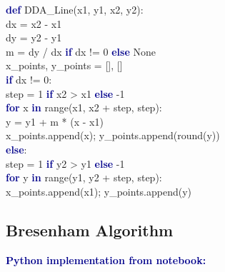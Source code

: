 \documentclass[12pt,a4paper]{article}
\begin{document}
\begin{tcolorbox}[colback=gray!5, colframe=darkblue!60]
\small\ttfamily
\textcolor{darkblue}{\textbf{def}} DDA\_Line(x1, y1, x2, y2):\\
\textcolor{gray!60}{\qquad{}}dx = x2 - x1\\
\textcolor{gray!60}{\qquad{}}dy = y2 - y1\\
\textcolor{gray!60}{\qquad{}}m = dy / dx \textcolor{darkblue}{\textbf{if}} dx != 0 \textcolor{darkblue}{\textbf{else}} None\\
\textcolor{gray!60}{\qquad{}}x\_points, y\_points = [], []\\
\textcolor{gray!60}{\qquad{}}\textcolor{darkblue}{\textbf{if}} dx != 0:\\
\textcolor{gray!60}{\qquad{}\qquad{}}step = 1 \textcolor{darkblue}{\textbf{if}} x2 > x1 \textcolor{darkblue}{\textbf{else}} -1\\
\textcolor{gray!60}{\qquad{}\qquad{}}\textcolor{darkblue}{\textbf{for}} x \textcolor{darkblue}{\textbf{in}} range(x1, x2 + step, step):\\
\textcolor{gray!60}{\qquad{}\qquad{}\qquad{}}y = y1 + m * (x - x1)\\
\textcolor{gray!60}{\qquad{}\qquad{}\qquad{}}x\_points.append(x); y\_points.append(round(y))\\
\textcolor{gray!60}{\qquad{}}\textcolor{darkblue}{\textbf{else}}:\\
\textcolor{gray!60}{\qquad{}\qquad{}}step = 1 \textcolor{darkblue}{\textbf{if}} y2 > y1 \textcolor{darkblue}{\textbf{else}} -1\\
\textcolor{gray!60}{\qquad{}\qquad{}}\textcolor{darkblue}{\textbf{for}} y \textcolor{darkblue}{\textbf{in}} range(y1, y2 + step, step):\\
\textcolor{gray!60}{\qquad{}\qquad{}\qquad{}}x\_points.append(x1); y\_points.append(y)
\end{tcolorbox}

\subsection{Bresenham Algorithm}
\textcolor{darkblue}{\textbf{Python implementation from notebook:}}
\end{document}
